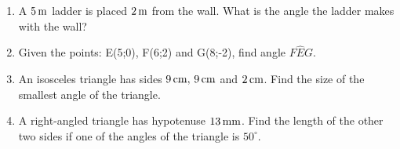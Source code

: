 \begin{enumerate}[noitemsep, label=\textbf{\arabic*}. ]
\label{m39414*uid110}\item A \begin{math}5\phantom{\rule{0.166667em}{0ex}}\mathrm{m}\end{math} ladder is placed \begin{math}2\phantom{\rule{0.166667em}{0ex}}\mathrm{m}\end{math} from the wall. What is the angle the ladder makes with the wall?\newline
            
\label{m39414*uid981203}\item Given the points: E(5;0), F(6;2) and G(8;-2), find angle \begin{math}F\hat{E}G\end{math}.\newline
            \label{m39414*uid111}\item An isosceles triangle has sides \begin{math}9\phantom{\rule{0.166667em}{0ex}}\mathrm{cm},\phantom{\rule{0.166667em}{0ex}}9\phantom{\rule{0.166667em}{0ex}}\mathrm{cm}\end{math} and \begin{math}2\phantom{\rule{0.166667em}{0ex}}\mathrm{cm}\end{math}. Find the size of the smallest angle of the triangle.\newline
            
\label{m39414*uid112}\item A right-angled triangle has hypotenuse \begin{math}13\phantom{\rule{0.166667em}{0ex}}\mathrm{mm}\end{math}. Find the length of the other two sides if one of the angles of the triangle is \begin{math}{50}^{\circ }\end{math}.\newline
            

\end{enumerate}
